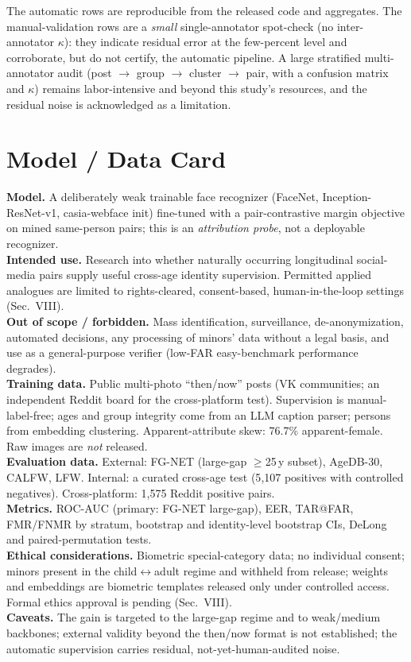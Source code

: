 \documentclass[journal]{IEEEtran}
\newcommand{\dgr}{$\leftrightarrow$}
\begin{document}
The automatic rows are reproducible from the released code and aggregates. The manual-validation rows
are a \emph{small} single-annotator spot-check (no inter-annotator $\kappa$): they indicate residual
error at the few-percent level and corroborate, but do not certify, the automatic pipeline. A large
stratified multi-annotator audit (post $\to$ group $\to$ cluster $\to$ pair, with a confusion matrix and
$\kappa$) remains labor-intensive and beyond this study's resources, and the residual noise is
acknowledged as a limitation.

\section{Model / Data Card}\label{sec:card}
\noindent\textbf{Model.} A deliberately weak trainable face recognizer (FaceNet, Inception-ResNet-v1,
casia-webface init) fine-tuned with a pair-contrastive margin objective on mined same-person pairs;
this is an \emph{attribution probe}, not a deployable recognizer.\\
\textbf{Intended use.} Research into whether naturally occurring longitudinal social-media pairs supply
useful cross-age identity supervision. Permitted applied analogues are limited to rights-cleared,
consent-based, human-in-the-loop settings (Sec.~VIII).\\
\textbf{Out of scope / forbidden.} Mass identification, surveillance, de-anonymization, automated
decisions, any processing of minors' data without a legal basis, and use as a general-purpose verifier
(low-FAR easy-benchmark performance degrades).\\
\textbf{Training data.} Public multi-photo ``then/now'' posts (VK communities; an independent Reddit
board for the cross-platform test). Supervision is manual-label-free; ages and group integrity come
from an LLM caption parser; persons from embedding clustering. Apparent-attribute skew: 76.7\%
apparent-female. Raw images are \emph{not} released.\\
\textbf{Evaluation data.} External: FG-NET (large-gap $\geq$25\,y subset), AgeDB-30, CALFW, LFW. Internal:
a curated cross-age test (5{,}107 positives with controlled negatives). Cross-platform: 1{,}575 Reddit
positive pairs.\\
\textbf{Metrics.} ROC-AUC (primary: FG-NET large-gap), EER, TAR@FAR, FMR/FNMR by stratum, bootstrap and
identity-level bootstrap CIs, DeLong and paired-permutation tests.\\
\textbf{Ethical considerations.} Biometric special-category data; no individual consent; minors present
in the child\dgr adult regime and withheld from release; weights and embeddings are biometric templates
released only under controlled access. Formal ethics approval is pending (Sec.~VIII).\\
\textbf{Caveats.} The gain is targeted to the large-gap regime and to weak/medium backbones; external
validity beyond the then/now format is not established; the automatic supervision carries residual,
not-yet-human-audited noise.
\end{document}
